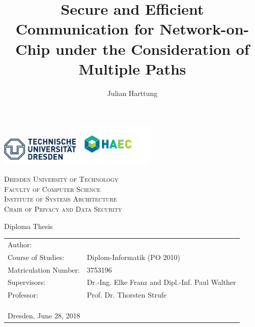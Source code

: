 \documentclass[
	paper=a4,
	fontsize=11pt,
	parskip=full %
]{scrreprt}
\author{Julian Harttung}
\title{Secure and Efficient Communication for Network-on-Chip under the Consideration of Multiple Paths}
\newcommand{\thesubtitle}{Diploma Thesis}
\newcommand{\theuniversity}{Dresden University of Technology}
\newcommand{\thefaculty}{Faculty of Computer Science}
\newcommand{\theinstitute}{Institute of Systems Architecture}
\newcommand{\thechair}{Chair of Privacy and Data Security}
\begin{document}
    \frenchspacing %
	\begin{titlepage}
		\includegraphics[width=0.28\textwidth]{header_logo_tud}
		\hfill
		\includegraphics[width=0.28\textwidth]{header_logo_haec} %
		\vspace{1.5\baselineskip}
		
		\begin{center}
			\textsc{\theuniversity \\
					\thefaculty \\
					\theinstitute \\
					\thechair}
			\vspace{2.5\baselineskip}
		
			\Huge{\thetitle}
			\vspace{.5\baselineskip}
			
			\LARGE{\thesubtitle}
		\end{center}
		
		\vfill
		
		\begin{tabular}{ll}
			Author:               & \theauthor \\
			Course of Studies:    & Diplom-Informatik (PO 2010)\\
			Matriculation Number: & 3753196 \\
			Supervisors:          & Dr.-Ing. Elke Franz and Dipl.-Inf. Paul Walther \\
			Professor:            & Prof. Dr. Thorsten Strufe \\
			\multicolumn{2}{l}{ } \\
			\multicolumn{2}{l}{ } \\
			\multicolumn{2}{l}{ } \\
			\multicolumn{2}{l}{Dresden, June 28, 2018}
		\end{tabular}
	\end{titlepage}
	
	
	
	
\end{document}
